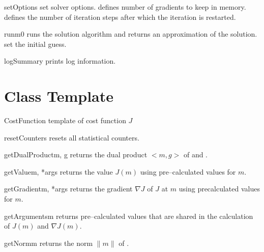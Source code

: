 \begin{methoddesc}[MinimizerLBFGS]{setOptions}{ }
set solver options.  defines number of gradients to keep in memory.
 defines the number of iteration steps after which the iteration is restarted.
\end{methoddesc}

\begin{methoddesc}[MinimizerLBFGS]{run}{m0}
runs the solution algorithm and returns an approximation of the solution.
 set the initial guess.
\end{methoddesc}

\begin{methoddesc}[MinimizerLBFGS]{logSummary}{}
prints log information.
\end{methoddesc}

\section{ Class Template}\label{chapter:ref:Minimization: costfunction class}

\begin{classdesc}{CostFunction}{}
template of cost function $J$
\end{classdesc}

\begin{methoddesc}[CostFunction]{resetCounters}{}
    resets all statistical counters.
\end{methoddesc}
%
\begin{methoddesc}[CostFunction]{getDualProduct}{m, g}
    returns the dual product $<m,g>$ of  and .
\end{methoddesc}
%
\begin{methoddesc}[CostFunction]{getValue}{m, *args}
    returns the value $J(m)$ using pre--calculated values  for $m$.
\end{methoddesc}
%
\begin{methoddesc}[CostFunction]{getGradient}{m, *args}
    returns the gradient $\nabla J$ of $J$ at $m$ using precalculated values   for $m$.
\end{methoddesc}
%
\begin{methoddesc}[CostFunction]{getArguments}{m}
    returns pre--calculated values that are shared in the calculation of $J(m)$
    and $\nabla J(m)$.
\end{methoddesc}
\begin{methoddesc}[CostFunction]{getNorm}{m}
returns the norm $\|m\|$ of .
\end{methoddesc}


